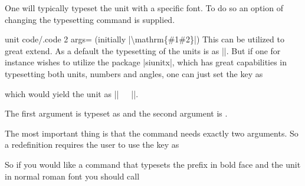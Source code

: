 One will typically typeset the unit with a specific font. To do so an option of changing the typesetting command is supplied.
\begin{pgfplotskey}{unit code/.code 2 args= (initially |\textbackslash mathrm\{\#1\#2\}|)}
  This can be utilized to great extend. As a default the typesetting of the units is as ||. But if one for instance
  wishes to utilize the package |siunitx|, which has great capabilities in typesetting both units, numbers and angles, one can just set the key as
\begin{codeexample}
\end{codeexample}
  which would yield the unit as |\si{||}|. 

  The first argument is typeset as  and the second argument is .
  
  The most important thing is that the command needs exactly two arguments. So a redefinition requires the user to use the key as
\begin{codeexample}
\end{codeexample}
So if you would like a command that typesets the prefix in bold face and the unit in normal roman font you should call
\begin{codeexample}[code only]
  \pgfplotsset{unit code/.code 2 args={\mathbf{#1}\mathrm{#2}}
\end{codeexample}
\end{pgfplotskey}


